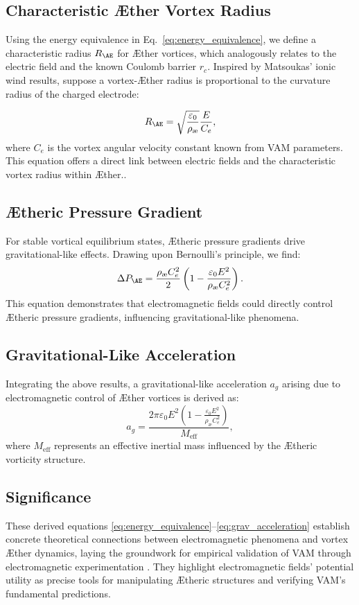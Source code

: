 \subsection{Characteristic Æther Vortex Radius}
Using the energy equivalence in Eq.~\eqref{eq:energy_equivalence}, we define a characteristic radius $R_{\AE}$ for Æther vortices, which analogously
relates to the electric field and the known Coulomb barrier $r_c$.  Inspired by Matsoukas' ionic wind results, suppose a vortex-Æther radius is
proportional to the curvature radius of the charged electrode:

\begin{equation}\label{eq:vortex_radius}
R_{\AE} = \sqrt{\frac{\varepsilon_0}{\rho_\text{\ae}}}\frac{E}{C_e},
\end{equation}
where $C_e$ is the vortex angular velocity constant known from VAM parameters.
This equation offers a direct link between electric fields and the characteristic vortex radius within Æther.\cite{RelationsBetweenConstants2005}.
\subsection{Ætheric Pressure Gradient}
For stable vortical equilibrium states, Ætheric pressure gradients drive gravitational-like effects. Drawing upon Bernoulli's principle, we find:
\begin{equation}\label{eq:pressure_gradient}
\Delta P_{\AE} = \frac{\rho_\text{\ae} C_e^2}{2}\left(1 - \frac{\varepsilon_0 E^2}{\rho_\text{\ae} C_e^2}\right).
\end{equation}
This equation demonstrates that electromagnetic fields could directly control Ætheric pressure gradients, influencing gravitational-like phenomena.
\subsection{Gravitational-Like Acceleration}
Integrating the above results, a gravitational-like acceleration $a_g$ arising due to electromagnetic control of Æther vortices is derived as:
\begin{equation}\label{eq:grav_acceleration}
a_{g} = \frac{2\pi \varepsilon_0 E^2\left(1 - \frac{\varepsilon_0 E^2}{\rho_\text{\ae}C_e^2}\right)}{M_\text{eff}},
\end{equation}
where $M_\text{eff}$ represents an effective inertial mass influenced by the Ætheric vorticity structure.
\subsection{Significance}
These derived equations \eqref{eq:energy_equivalence}--\eqref{eq:grav_acceleration} establish concrete theoretical connections between electromagnetic phenomena and vortex Æther dynamics, laying the groundwork for empirical validation of VAM through electromagnetic experimentation \cite{Podkletnov2007, Kleckner2013}. They highlight electromagnetic fields' potential utility as precise tools for manipulating Ætheric structures and verifying VAM's fundamental predictions.